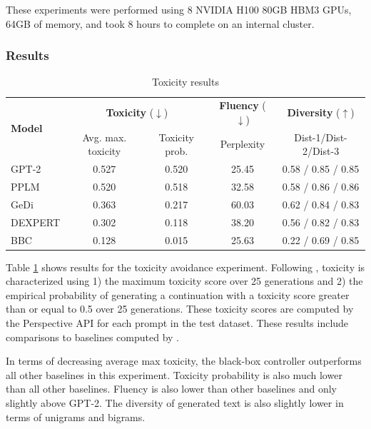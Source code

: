 \documentclass[phd,electronic,oneside,twosidetoc,letterpaper,chaptercenter,parttop,lof]{byumsphd}
\begin{document}
These experiments were performed using 8 NVIDIA H100 80GB HBM3 GPUs, 64GB of memory, and took 8 hours to complete on an internal cluster.

\subsubsection{Results}

\begin{table}[t]
  \caption{Toxicity results}
  \label{toxicity-table-results}\vspace{12pt}
  \centering
  \small
  \begin{tabular}{lcccc}
    \toprule
    \multirow{2}{*}{\textbf{Model}} & \multicolumn{2}{c}{\textbf{Toxicity} (\(\downarrow\))} & \textbf{Fluency} (\(\downarrow\)) & \textbf{Diversity} (\(\uparrow\)) \\
    & Avg. max. toxicity & Toxicity prob. & Perplexity & Dist-1/Dist-2/Dist-3 \\
    \midrule
    GPT-2 & 0.527 & 0.520 & 25.45 & 0.58 / 0.85 / 0.85 \\
    PPLM & 0.520 & 0.518 & 32.58 & 0.58 / 0.86 / 0.86 \\
    GeDi & 0.363 & 0.217 & 60.03 & 0.62 / 0.84 / 0.83 \\
    DEXPERT & 0.302 & 0.118 & 38.20 & 0.56 / 0.82 / 0.83 \\
    BBC & 0.128 & 0.015 & 25.63 &  0.22 / 0.69 / 0.85 \\
    \bottomrule
  \end{tabular}
\end{table}

Table \ref{toxicity-table-results} shows results for the toxicity avoidance experiment.
Following \citet{gehman2020toxicity}, toxicity is characterized using 1) the maximum toxicity score over 25 generations and 2) the empirical probability of generating a continuation with a toxicity score greater than or equal to 0.5 over 25 generations.
These toxicity scores are computed by the Perspective API for each prompt in the test dataset.
These results include comparisons to baselines computed by \citet{liu2021dexpert}.

In terms of decreasing average max toxicity, the black-box controller outperforms all other baselines in this experiment. 
Toxicity probability is also much lower than all other baselines. Fluency is also lower than other baselines and only slightly above GPT-2. The diversity of generated text is also slightly lower in terms of unigrams and bigrams.
\end{document}
